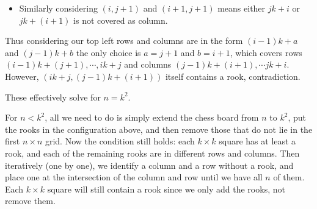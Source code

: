 \documentclass[11pt,a4paper]{article}
\begin{document}
\begin{enumerate}
\begin{itemize}
\begin{itemize}
			\item Similarly considering $(i, j+1)$ and $(i+1, j+1)$ means either $jk+i$ or $jk+(i+1)$ is not covered as column. 
		\end{itemize}
		Thus considering our top left rows and columns are in the form $(i-1)k+a$ and $(j-1)k+b$ the only choice is $a=j+1$ and $b=i+1$, which covers rows $(i-1)k+(j+1), \cdots , ik+j$ and columns $(j-1)k+(i+1), \cdots jk+i$. 
		However, $(ik+j, (j-1)k+(i+1))$ itself contains a rook, contradiction. 
	\end{itemize}
	These effectively solve for $n=k^2$. 
	
	For $n<k^2$, all we need to do is simply extend the chess board from $n$ to $k^2$, put the rooks in the configuration above, and then remove those that do not lie in the first $n\times n$ grid. Now the condition still holds: each $k\times k$ square has at least a rook, and each of the remaining rooks are in different rows and columns. Then iteratively (one by one), we identify a column and a row without a rook, and place one at the intersection of the column and row until we have all $n$ of them. Each $k\times k$ square will still contain a rook since we only add the rooks, not remove them. 
\end{enumerate}
\end{document}
